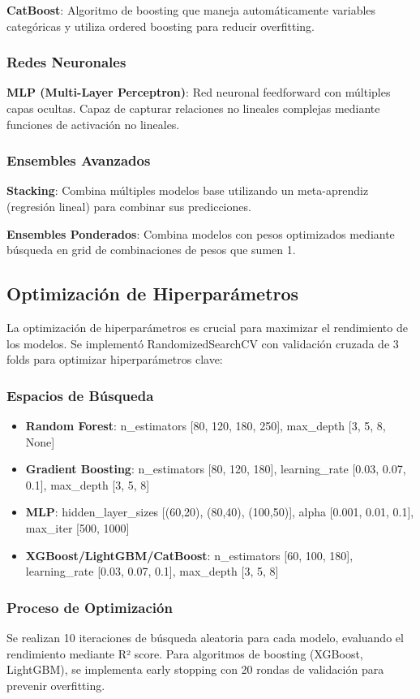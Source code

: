 \documentclass[conference]{IEEEtran}
\begin{document}
	\textbf{CatBoost}: Algoritmo de boosting que maneja automáticamente variables categóricas y utiliza ordered boosting para reducir overfitting.
	
	\subsubsection{Redes Neuronales}
	\textbf{MLP (Multi-Layer Perceptron)}: Red neuronal feedforward con múltiples capas ocultas. Capaz de capturar relaciones no lineales complejas mediante funciones de activación no lineales.
	
	\subsubsection{Ensembles Avanzados}
	\textbf{Stacking}: Combina múltiples modelos base utilizando un meta-aprendiz (regresión lineal) para combinar sus predicciones.
	
	\textbf{Ensembles Ponderados}: Combina modelos con pesos optimizados mediante búsqueda en grid de combinaciones de pesos que sumen 1.
	
	\subsection{Optimización de Hiperparámetros}
	La optimización de hiperparámetros es crucial para maximizar el rendimiento de los modelos. Se implementó RandomizedSearchCV con validación cruzada de 3 folds para optimizar hiperparámetros clave:
	
	\subsubsection{Espacios de Búsqueda}
	\begin{itemize}
		\item \textbf{Random Forest}: n\_estimators [80, 120, 180, 250], max\_depth [3, 5, 8, None]
		\item \textbf{Gradient Boosting}: n\_estimators [80, 120, 180], learning\_rate [0.03, 0.07, 0.1], max\_depth [3, 5, 8]
		\item \textbf{MLP}: hidden\_layer\_sizes [(60,20), (80,40), (100,50)], alpha [0.001, 0.01, 0.1], max\_iter [500, 1000]
		\item \textbf{XGBoost/LightGBM/CatBoost}: n\_estimators [60, 100, 180], learning\_rate [0.03, 0.07, 0.1], max\_depth [3, 5, 8]
	\end{itemize}
	
	\subsubsection{Proceso de Optimización}
	Se realizan 10 iteraciones de búsqueda aleatoria para cada modelo, evaluando el rendimiento mediante R² score. Para algoritmos de boosting (XGBoost, LightGBM), se implementa early stopping con 20 rondas de validación para prevenir overfitting.
	
\end{document}
